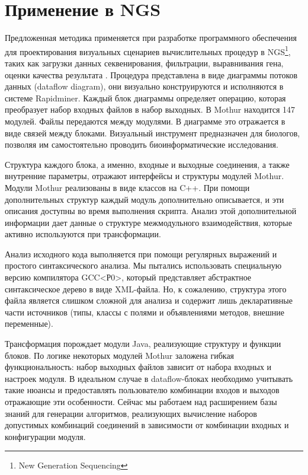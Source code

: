\documentclass[conference]{IEEEtran} \IEEEoverridecommandlockouts
\begin{document}
\section{Применение в NGS} \label{sec:ngs-appl}

Предложенная методика применяется при разработке программного обеспечения для проектирования визуальных сценариев вычислительных процедур в NGS\footnote{New Generation Sequencing}, таких как загрузки данных секвенирования, фильтрации, выравнивания гена, оценки качества результата \cite{bit2019}. Процедура представлена в виде диаграммы потоков данных (dataflow diagram), они визуально конструируются и исполняются в системе Rapidminer. Каждый блок диаграммы определяет операцию, которая преобразует набор входных файлов в набор выходных.  В Mothur находится 147 модулей. Файлы передаются между модулями. В диаграмме это отражается в виде связей между блоками. Визуальный инструмент предназначен для биологов, позволяя им самостоятельно проводить биоинформатические исследования.

Структура каждого блока, а именно, входные и выходные соединения, а также внутренние параметры, отражают интерфейсы и структуры модулей Mothur. Модули Mothur реализованы в виде классов на C++.  При помощи дополнительных структур каждый модуль дополнительно описывается, и эти описания доступны во время выполнения скрипта. Анализ этой дополнительной информации дает данные о структуре межмодульного взаимодействия, которые активно используются при трансформации.

Анализ исходного кода выполняется при помощи регулярных выражений и простого синтаксического анализа. Мы пытались использовать специальную версию компилятора GCC<Р0>, который представляет абстрактное синтаксическое дерево в виде XML-файла. Но, к сожалению, структура этого файла является слишком сложной для анализа и содержит лишь декларативные части источников (типы, классы с полями и объявлениями методов, внешние переменные).

Трансформация порождает модули Java, реализующие структуру и функции блоков. По логике некоторых модулей Mothur заложена гибкая функциональность: набор выходных файлов зависит от набора входных и настроек модуля.  В идеальном случае в dataflow-блоках необходимо учитывать такие нюансы и предоставлять пользователю комбинации входов и выходов отражающие эти особенности. Сейчас мы работаем над расширением базы знаний для генерации алгоритмов, реализующих вычисление наборов допустимых комбинаций соединений в зависимости от комбинации входных и конфигурации модуля.
\end{document}
